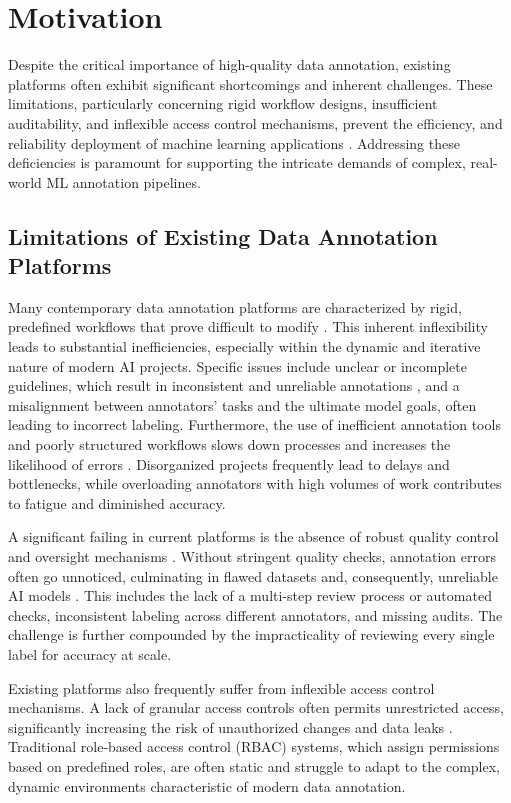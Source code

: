 \section{Motivation}
\label{sec:chapter-1-motivation}

Despite the critical importance of high-quality data annotation, existing platforms often exhibit significant shortcomings and inherent challenges. These limitations, particularly concerning rigid workflow designs, insufficient auditability, and inflexible access control mechanisms, prevent the efficiency, and reliability deployment of machine learning applications \cite{johnson2021challenges}. Addressing these deficiencies is paramount for supporting the intricate demands of complex, real-world ML annotation pipelines.

\subsection{Limitations of Existing Data Annotation Platforms}
Many contemporary data annotation platforms are characterized by rigid, predefined workflows that prove difficult to modify \cite{li2022annotation}. This inherent inflexibility leads to substantial inefficiencies, especially within the dynamic and iterative nature of modern AI projects. Specific issues include unclear or incomplete guidelines, which result in inconsistent and unreliable annotations \cite{chen2020guideline}, and a misalignment between annotators' tasks and the ultimate model goals, often leading to incorrect labeling. Furthermore, the use of inefficient annotation tools and poorly structured workflows slows down processes and increases the likelihood of errors \cite{wang2019workflow}. Disorganized projects frequently lead to delays and bottlenecks, while overloading annotators with high volumes of work contributes to fatigue and diminished accuracy.

A significant failing in current platforms is the absence of robust quality control and oversight mechanisms \cite{parker2022quality}. Without stringent quality checks, annotation errors often go unnoticed, culminating in flawed datasets and, consequently, unreliable AI models \cite{smith2020dataquality}. This includes the lack of a multi-step review process or automated checks, inconsistent labeling across different annotators, and missing audits. The challenge is further compounded by the impracticality of reviewing every single label for accuracy at scale.

Existing platforms also frequently suffer from inflexible access control mechanisms. A lack of granular access controls often permits unrestricted access, significantly increasing the risk of unauthorized changes and data leaks \cite{davies2023security}. Traditional role-based access control (RBAC) systems, which assign permissions based on predefined roles, are often static and struggle to adapt to the complex, dynamic environments characteristic of modern data annotation.

